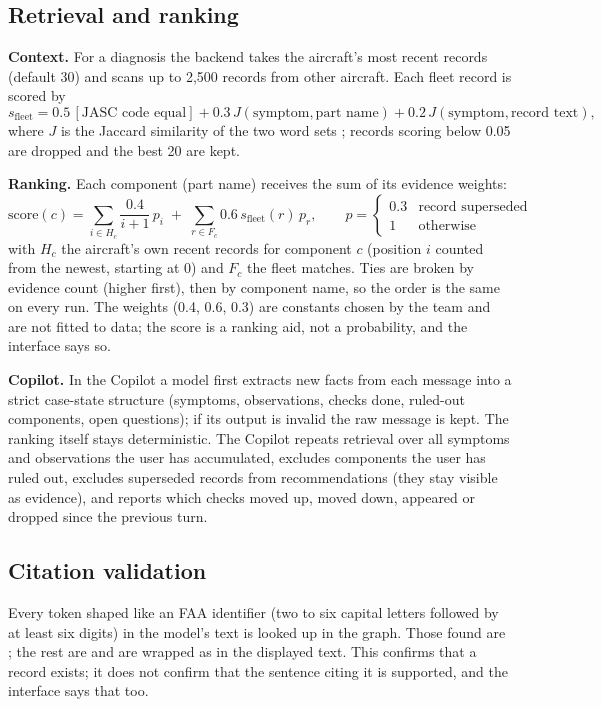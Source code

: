 \subsection{Retrieval and ranking}\label{sec:alg-rank}
\textbf{Context.} For a diagnosis the backend takes the aircraft's most recent records (default 30) and scans up to 2,500 records from other aircraft. Each fleet record is scored by
\[
s_{\text{fleet}} = 0.5\,[\text{JASC code equal}] + 0.3\,J(\text{symptom},\text{part name}) + 0.2\,J(\text{symptom},\text{record text}),
\]
where $J$ is the Jaccard similarity of the two word sets \citep{jaccard1912}; records scoring below 0.05 are dropped and the best 20 are kept.

\textbf{Ranking.} Each component (part name) receives the sum of its evidence weights:
\[
\text{score}(c) = \sum_{i\in H_c} \frac{0.4}{i+1}\,p_i \;+\; \sum_{r\in F_c} 0.6\, s_{\text{fleet}}(r)\, p_r ,
\qquad p = \begin{cases}0.3 & \text{record superseded}\\ 1 & \text{otherwise}\end{cases}
\]
with $H_c$ the aircraft's own recent records for component $c$ (position $i$ counted from the newest, starting at 0) and $F_c$ the fleet matches. Ties are broken by evidence count (higher first), then by component name, so the order is the same on every run. The weights (0.4, 0.6, 0.3) are constants chosen by the team and are not fitted to data; the score is a ranking aid, not a probability, and the interface says so.

\textbf{Copilot.} In the Copilot a model first extracts new facts from each message into a strict case-state structure (symptoms, observations, checks done, ruled-out components, open questions); if its output is invalid the raw message is kept. The ranking itself stays deterministic. The Copilot repeats retrieval over all symptoms and observations the user has accumulated, excludes components the user has ruled out, excludes superseded records from recommendations (they stay visible as evidence), and reports which checks moved up, moved down, appeared or dropped since the previous turn.

\subsection{Citation validation}
Every token shaped like an FAA identifier (two to six capital letters followed by at least six digits) in the model's text is looked up in the graph. Those found are ; the rest are  and are wrapped as \code{[UNVERIFIED:id]} in the displayed text. This confirms that a record exists; it does not confirm that the sentence citing it is supported, and the interface says that too.

